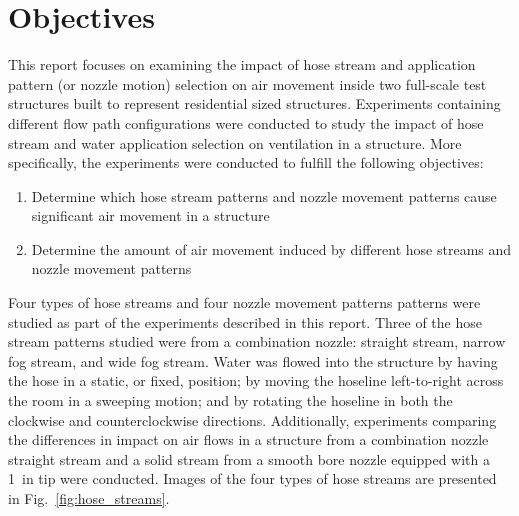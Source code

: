 \documentclass[12pt,oneside]{book}
\begin{document}
\section{Objectives}
\label{sec:objectives}
This report focuses on examining the impact of hose stream and application pattern (or nozzle motion) selection on air movement inside two full-scale test structures built to represent residential sized structures. Experiments containing different flow path configurations were conducted to study the impact of hose stream and water application selection on ventilation in a structure. More specifically, the experiments were conducted to fulfill the following objectives:

\begin{enumerate}
	\item Determine which hose stream patterns and nozzle movement patterns cause significant air movement in a structure 
	\item Determine the amount of air movement induced by different hose streams and nozzle movement patterns
	
\end{enumerate}

Four types of hose streams and four nozzle movement patterns patterns were studied as part of the experiments described in this report. Three of the hose stream patterns studied were from a combination nozzle: straight stream, narrow fog stream, and wide fog stream. Water was flowed into the structure by having the hose in a static, or fixed, position; by moving the hoseline left-to-right across the room in a sweeping motion; and by rotating the hoseline in both the clockwise and counterclockwise directions. Additionally, experiments comparing the differences in impact on air flows in a structure from a combination nozzle straight stream and a solid stream from a smooth bore nozzle equipped with a 1~in tip were conducted. Images of the four types of hose streams are presented in Fig.~\ref{fig:hose_streams}.
\end{document}

